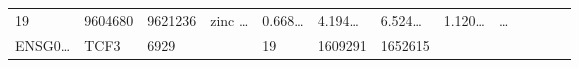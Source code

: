 \documentclass[
]{article}
\begin{document}
\begin{longtable}[]{@{}lllllllllllll@{}}
\begin{minipage}[t]{0.05\columnwidth}
19\strut
\end{minipage} & \begin{minipage}[t]{0.05\columnwidth}\raggedright
9604680\strut
\end{minipage} & \begin{minipage}[t]{0.05\columnwidth}\raggedright
9621236\strut
\end{minipage} & \begin{minipage}[t]{0.05\columnwidth}\raggedright
zinc \ldots{}\strut
\end{minipage} & \begin{minipage}[t]{0.05\columnwidth}\raggedright
0.668\ldots{}\strut
\end{minipage} & \begin{minipage}[t]{0.05\columnwidth}\raggedright
4.194\ldots{}\strut
\end{minipage} & \begin{minipage}[t]{0.05\columnwidth}\raggedright
6.524\ldots{}\strut
\end{minipage} & \begin{minipage}[t]{0.05\columnwidth}\raggedright
1.120\ldots{}\strut
\end{minipage} & \begin{minipage}[t]{0.02\columnwidth}\raggedright
\ldots{}\strut
\end{minipage}\tabularnewline
\begin{minipage}[t]{0.05\columnwidth}\raggedright
ENSG0\ldots{}\strut
\end{minipage} & \begin{minipage}[t]{0.05\columnwidth}\raggedright
TCF3\strut
\end{minipage} & \begin{minipage}[t]{0.05\columnwidth}\raggedright
6929\strut
\end{minipage} & \begin{minipage}[t]{0.05\columnwidth}\raggedright
\strut
\end{minipage} & \begin{minipage}[t]{0.05\columnwidth}\raggedright
19\strut
\end{minipage} & \begin{minipage}[t]{0.05\columnwidth}\raggedright
1609291\strut
\end{minipage} & \begin{minipage}[t]{0.05\columnwidth}\raggedright
1652615\strut
\end{minipage} & \begin{minipage}[t]{0.05\columnwidth}\raggedright

\end{minipage}
\end{longtable}
\end{document}
